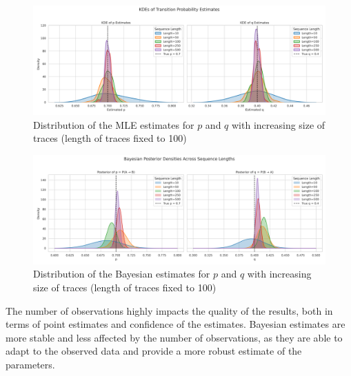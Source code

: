 \documentclass[twocolumn, 9pt]{extarticle}
\begin{document}
\begin{figure}[h]
\centering
  \includegraphics[width=\linewidth]{../DTMC/plots/kde_distributions_MLE_sequences.png}
  \caption{\footnotesize{Distribution of the MLE estimates for $p$ and $q$ with increasing size of traces (length of traces fixed to 100)}}
  \label{fig:distribution_plot_MLE_sequences}
\end{figure}


\begin{figure}[ht]
\centering
\includegraphics[width=\linewidth]{../DTMC/plots/posterior_distribution_sequences.png}
\caption{\footnotesize{Distribution of the Bayesian estimates for $p$ and $q$ with increasing size of traces (length of traces fixed to 100)}}
\label{fig:distribution_plot_Bayesian_sequences}
\end{figure}

The number of observations highly impacts the quality of the results, both in terms of point estimates and confidence of the estimates.
Bayesian estimates are more stable and less affected by the number of observations, as they are able to adapt to the observed data and provide a more robust estimate of the parameters.
\end{document}
